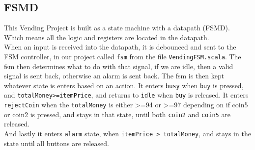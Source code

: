 \subsection{FSMD}
This Vending Project is built as a state machine with a datapath (FSMD). Which means all the logic and registers are located in the datapath.\\
When an input is received into the datapath, it is debounced and sent to the FSM controller, in our project called \texttt{fsm} from the file \texttt{VendingFSM.scala}. The fsm then determines what to do with that signal, if we are idle, then a valid signal is sent back, otherwise an alarm is sent back. The fsm is then kept whatever state is enters based on an action. It enters \texttt{busy} when \texttt{buy} is pressed, and \texttt{totalMoney>=itemPrice}, and returns to \texttt{idle} when \texttt{buy} is released.
It enters \texttt{rejectCoin} when the \texttt{totalMoney} is either >=94 or >=97 depending on if coin5 or coin2 is pressed, and stays in that state, until both \texttt{coin2} and \texttt{coin5} are released. \\
And lastly it enters \texttt{alarm} state, when \texttt{itemPrice > totalMoney}, and stays in the state until all buttons are released.




